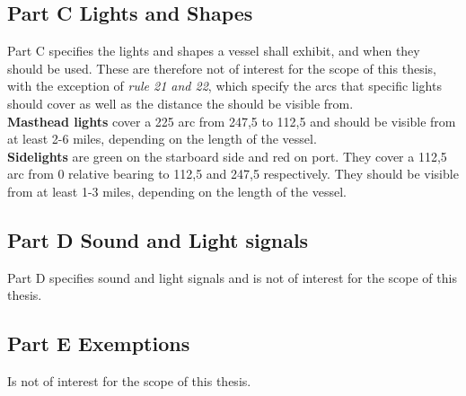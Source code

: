 \subsection{Part C Lights and Shapes}
Part C specifies the lights and shapes a vessel shall exhibit, and when they should be used. These are therefore not of interest for the scope of this thesis, with the exception of \textit{rule 21 and 22}, which specify the arcs that specific lights should cover as well as the distance the should be visible from.
\\
\textbf{Masthead lights} cover a 225 \textdegree arc from 247,5 \textdegree to 112,5 \textdegree and should be visible from at least 2-6 miles, depending on the length of the vessel.\\
\textbf{Sidelights} are green on the starboard side and red on port. They cover a 112,5 arc from 0 relative bearing to 112,5 and 247,5 respectively. They should be visible from at least 1-3 miles, depending on the length of the vessel.
\subsection{Part D Sound and Light signals}
Part D specifies sound and light signals and is not of interest for the scope of this thesis.
\subsection{Part E Exemptions}
Is not of interest for the scope of this thesis.



